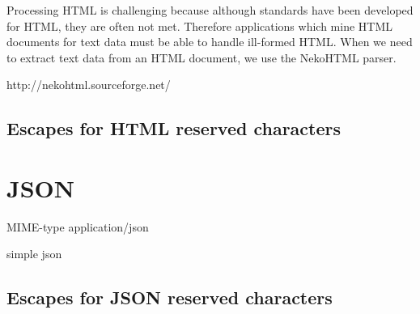 Processing HTML is challenging because although standards
have been developed for HTML, they are often not met.
Therefore applications which mine HTML documents for text data
must be able to handle ill-formed HTML.
When we need to extract text data from an HTML document,
we use the NekoHTML parser.

http://nekohtml.sourceforge.net/

\subsection{Escapes for HTML reserved characters}

\section{JSON}

MIME-type application/json

simple json

\subsection{Escapes for JSON reserved characters}

